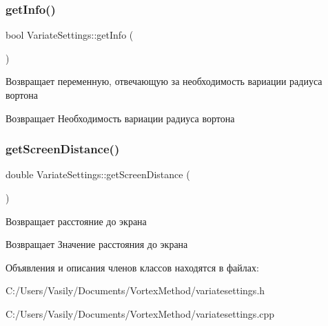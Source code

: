 \subsubsection{\texorpdfstring{get\+Info()}{getInfo()}}
{\footnotesize\ttfamily bool Variate\+Settings\+::get\+Info (\begin{DoxyParamCaption}{ }\end{DoxyParamCaption})}

Возвращает переменную, отвечающую за необходимость вариации радиуса вортона \begin{DoxyReturn}{Возвращает}
Необходимость вариации радиуса вортона 
\end{DoxyReturn}
\mbox{\label{class_variate_settings_a7d21b9005c53002e522cf84bc2695d45}} 
\subsubsection{\texorpdfstring{get\+Screen\+Distance()}{getScreenDistance()}}
{\footnotesize\ttfamily double Variate\+Settings\+::get\+Screen\+Distance (\begin{DoxyParamCaption}{ }\end{DoxyParamCaption})}

Возвращает расстояние до экрана \begin{DoxyReturn}{Возвращает}
Значение расстояния до экрана 
\end{DoxyReturn}


Объявления и описания членов классов находятся в файлах\+:\begin{DoxyCompactItemize}
\item 
C\+:/\+Users/\+Vasily/\+Documents/\+Vortex\+Method/variatesettings.\+h\item 
C\+:/\+Users/\+Vasily/\+Documents/\+Vortex\+Method/variatesettings.\+cpp\end{DoxyCompactItemize}
